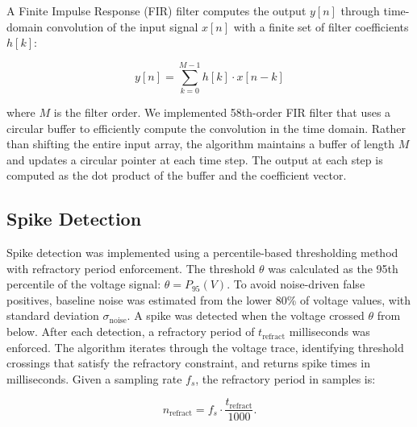     A Finite Impulse Response (FIR) filter computes the output $y[n]$ through time-domain convolution of the input signal $x[n]$ with a finite set of filter coefficients $h[k]$:

    \[
    y[n] = \sum_{k=0}^{M-1} h[k] \cdot x[n-k]
    \]

    where $M$ is the filter order.  
    We implemented 58th-order FIR filter that uses a circular buffer to efficiently compute the convolution in the time domain.  
    Rather than shifting the entire input array, the algorithm maintains a buffer of length $M$ and updates a circular pointer at each time step.  
    The output at each step is computed as the dot product of the buffer and the coefficient vector.  

\subsection{Spike Detection}
\label{subsection:spike-detection}

    Spike detection was implemented using a percentile-based thresholding method with refractory period enforcement.  
    The threshold $\theta$ was calculated as the 95th percentile of the voltage signal: $\theta = P_{95}(V)$.
    To avoid noise-driven false positives, baseline noise was estimated from the lower 80\% of voltage values, with standard deviation $\sigma_{\text{noise}}$.  
    A spike was detected when the voltage crossed $\theta$ from below.  
    After each detection, a refractory period of $t_{\text{refract}}$ milliseconds was enforced.
    The algorithm iterates through the voltage trace, identifying threshold crossings that satisfy the refractory constraint, and returns spike times in milliseconds.  
    Given a sampling rate $f_s$, the refractory period in samples is:

    \[
    n_{\text{refract}} = f_s \cdot \frac{t_{\text{refract}}}{1000}.
    \]